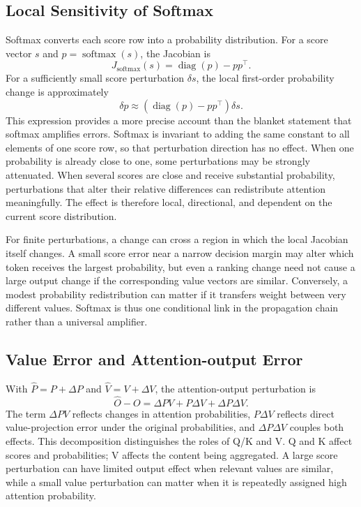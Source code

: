 \subsection{Local Sensitivity of Softmax}

Softmax converts each score row into a probability distribution. For a score vector $s$ and $p=\operatorname{softmax}(s)$, the Jacobian is
\begin{equation}
J_{\mathrm{softmax}}(s)=\operatorname{diag}(p)-pp^\top.
\end{equation}
For a sufficiently small score perturbation $\delta s$, the local first-order probability change is approximately
\begin{equation}
\delta p\approx
\left(\operatorname{diag}(p)-pp^\top\right)\delta s.
\end{equation}
This expression provides a more precise account than the blanket statement that softmax amplifies errors. Softmax is invariant to adding the same constant to all elements of one score row, so that perturbation direction has no effect. When one probability is already close to one, some perturbations may be strongly attenuated. When several scores are close and receive substantial probability, perturbations that alter their relative differences can redistribute attention meaningfully. The effect is therefore local, directional, and dependent on the current score distribution.

For finite perturbations, a change can cross a region in which the local Jacobian itself changes. A small score error near a narrow decision margin may alter which token receives the largest probability, but even a ranking change need not cause a large output change if the corresponding value vectors are similar. Conversely, a modest probability redistribution can matter if it transfers weight between very different values. Softmax is thus one conditional link in the propagation chain rather than a universal amplifier.

\subsection{Value Error and Attention-output Error}

With $\hat{P}=P+\Delta P$ and $\hat{V}=V+\Delta V$, the attention-output perturbation is
\begin{equation}
\hat{O}-O
=
\Delta PV
+P\Delta V
+\Delta P\Delta V.
\end{equation}
The term $\Delta PV$ reflects changes in attention probabilities, $P\Delta V$ reflects direct value-projection error under the original probabilities, and $\Delta P\Delta V$ couples both effects. This decomposition distinguishes the roles of Q/K and V. Q and K affect scores and probabilities; V affects the content being aggregated. A large score perturbation can have limited output effect when relevant values are similar, while a small value perturbation can matter when it is repeatedly assigned high attention probability.

